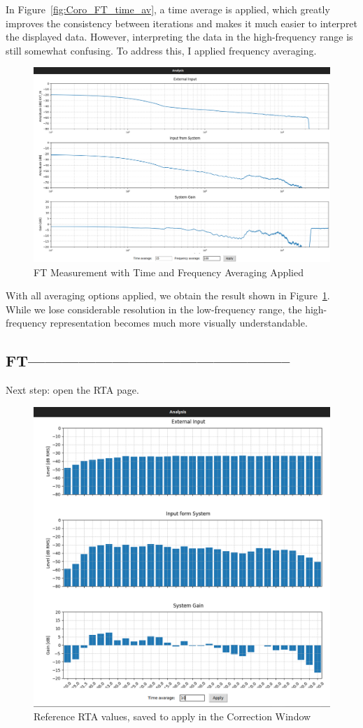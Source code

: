 In Figure~\ref{fig:Coro_FT_time_av}, a time average is applied, which greatly improves the consistency between iterations and makes it much easier to interpret the displayed data. However, interpreting the data in the high-frequency range is still somewhat confusing. To address this, I applied frequency averaging.

\begin{figure}[H]
	\centering
	\includegraphics[width=0.8
	\linewidth]{Figures/Coro_FT_WITH_av.png}
	\caption{FT Measurement with Time and Frequency Averaging Applied}
	\label{fig:Coro_FT_av}
\end{figure}

With all averaging options applied, we obtain the result shown in Figure~\ref{fig:Coro_FT_av}. While we lose considerable resolution in the low-frequency range, the high-frequency representation becomes much more visually understandable.

\subsection{FT-----------------------------------------------}

Next step: open the RTA page.

\begin{figure}[H]
	\centering
	\includegraphics[width=0.8
	\linewidth]{Figures/Coro_RTA_Saved.png}
	\caption{Reference RTA values, saved to apply in the Correction Window}
	\label{fig:Coro_RTA_saved}
\end{figure}

